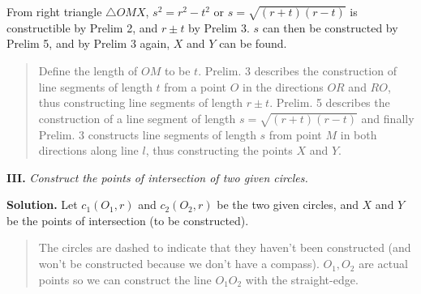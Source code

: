 \documentclass[11pt,a4paper]{article}
\newcommand*{\qed}{%
$\quad\quad$\raisebox{2pt}{\framebox[10pt]{\rule{0pt}{4pt}}}%
}
\begin{document}
From right triangle $\triangle OMX$, $s^2=r^2-t^2$ or $s=\sqrt{(r+t)(r-t)}$ is constructible by Prelim 2, and $r \pm t$ by Prelim 3. $s$ can then be constructed by Prelim 5, and by Prelim 3 again, $X$ and $Y$ can be found. \qed
\begin{quote}
Define the length of $OM$ to be $t$. Prelim. 3 describes the construction of line segments of length $t$ from a point $O$ in the directions $OR$ and $RO$, thus constructing line segments of length $r\pm t$. Prelim. 5 describes the construction of a line segment of length $s=\sqrt{(r+t)(r-t)}$ and finally Prelim. 3 constructs line segments of length $s$ from point $M$ in both directions along line $l$, thus constructing the points $X$ and $Y$.
\end{quote}

\textbf{III.} \textit{Construct the points of intersection of two given circles.}

\textbf{Solution.} Let $c_1(O_1,r)$ and $c_2(O_2,r)$ be the two given circles, and $X$ and $Y$ be the points of intersection (to be constructed).
\begin{center}
\end{center}
\begin{quote}
\vspace*{-8pt}
The circles are dashed to indicate that they haven't been constructed (and won't be constructed because we don't have a compass). $O_1,O_2$ are actual points so we can construct the line $O_1O_2$ with the straight-edge.
\vspace*{-12pt}
\end{quote}
\end{document}
